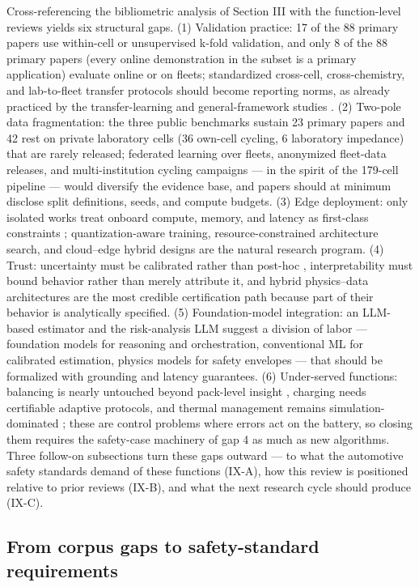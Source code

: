 \documentclass[journal]{IEEEtran}
\begin{document}
Cross-referencing the bibliometric analysis of Section III with the function-level reviews yields six structural gaps. (1) Validation practice: 17 of the 88 primary papers use within-cell or unsupervised k-fold validation, and only 8 of the 88 primary papers (every online demonstration in the subset is a primary application) evaluate online or on fleets; standardized cross-cell, cross-chemistry, and lab-to-fleet transfer protocols should become reporting norms, as already practiced by the transfer-learning and general-framework studies \cite{r69}\cite{r68}. (2) Two-pole data fragmentation: the three public benchmarks sustain 23 primary papers and 42 rest on private laboratory cells (36 own-cell cycling, 6 laboratory impedance) that are rarely released; federated learning over fleets, anonymized fleet-data releases, and multi-institution cycling campaigns --- in the spirit of the 179-cell pipeline \cite{r50} --- would diversify the evidence base, and papers should at minimum disclose split definitions, seeds, and compute budgets. (3) Edge deployment: only isolated works treat onboard compute, memory, and latency as first-class constraints \cite{r59}\cite{r105}; quantization-aware training, resource-constrained architecture search, and cloud--edge hybrid designs are the natural research program. (4) Trust: uncertainty must be calibrated rather than post-hoc \cite{r77}, interpretability must bound behavior rather than merely attribute it, and hybrid physics--data architectures are the most credible certification path because part of their behavior is analytically specified. (5) Foundation-model integration: an LLM-based estimator \cite{r15} and the risk-analysis LLM \cite{r14} suggest a division of labor --- foundation models for reasoning and orchestration, conventional ML for calibrated estimation, physics models for safety envelopes --- that should be formalized with grounding and latency guarantees. (6) Under-served functions: balancing is nearly untouched beyond pack-level insight \cite{r30}, charging needs certifiable adaptive protocols, and thermal management remains simulation-dominated \cite{r25}; these are control problems where errors act on the battery, so closing them requires the safety-case machinery of gap 4 as much as new algorithms. Three follow-on subsections turn these gaps outward --- to what the automotive safety standards demand of these functions (IX-A), how this review is positioned relative to prior reviews (IX-B), and what the next research cycle should produce (IX-C).

\subsection{From corpus gaps to safety-standard requirements}
\end{document}
